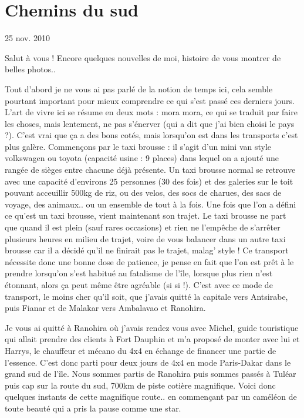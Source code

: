 \section{Chemins du sud}

25 nov. 2010

\begin{multicols}{2}

Salut à vous ! Encore quelques nouvelles de moi, histoire de vous montrer de belles photos..

Tout d'abord je ne vous ai pas parlé de la notion de temps ici, cela semble pourtant important pour mieux comprendre ce qui s'est passé ces derniers jours. L'art de vivre ici se résume en deux mots : mora mora, ce qui se traduit par faire les choses, mais lentement, ne pas s'énerver (qui a dit que j'ai bien choisi le pays ?). C'est vrai que ça a des bons cotés, mais lorsqu'on est dans les transports c'est plus galère. Commençons par le taxi brousse : il s'agit d'un mini van style volkswagen ou toyota (capacité usine : 9 places) dans lequel on a ajouté une rangée de sièges entre chacune déjà présente. Un taxi brousse normal se retrouve avec une capacité d'environs 25 personnes (30 des fois) et des galeries sur le toit pouvant acceuillir 500kg de riz, ou des velos, des socs de charues, des sacs de voyage, des animaux.. ou un ensemble de tout à la fois. Une fois que l'on a défini ce qu'est un taxi brousse, vient maintenant son trajet. Le taxi brousse ne part que quand il est plein (sauf rares occasions) et rien ne l'empêche de s'arrêter plusieurs heures en milieu de trajet, voire de vous balancer dans un autre taxi brousse car il a décidé qu'il ne finirait pas le trajet, malag' style ! Ce transport nécessite donc une bonne dose de patience, je pense en fait que l'on est prêt à le prendre lorsqu'on s'est habitué au fatalisme de l'île, lorsque plus rien n'est étonnant, alors ça peut même être agréable (si si !). C'est avec ce mode de transport, le moins cher qu'il soit, que j'avais quitté la capitale vers Antsirabe, puis Fianar et de Malakar vers Ambalavao et Ranohira.

Je vous ai quitté à Ranohira où j'avais rendez vous avec Michel, guide touristique qui allait prendre des clients à Fort Dauphin et m'a proposé de monter avec lui et Harrys, le chauffeur et mécano du 4x4 en échange de financer une partie de l'essence. C'est donc parti pour deux jours de 4x4 en mode Paris-Dakar dans le grand sud de l'île. Nous sommes partis de Ranohira puis sommes passés à Tuléar puis cap sur la route du sud, 700km de piste cotière magnifique. Voici donc quelques instants de cette magnifique route.. en commençant par un caméléon de toute beauté qui a pris la pause comme une star.


\end{multicols}
